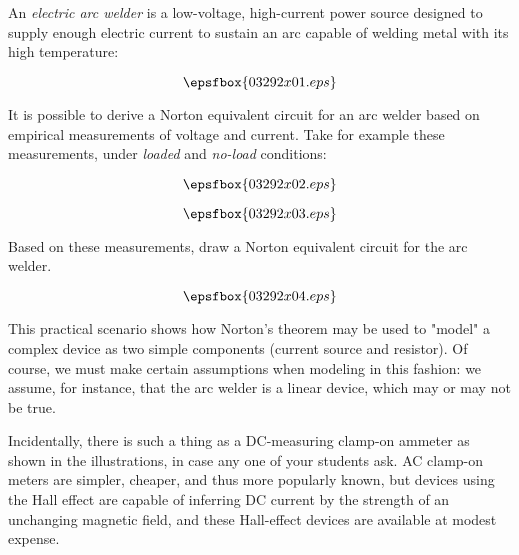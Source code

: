 

An {\it electric arc welder} is a low-voltage, high-current power source designed to supply enough electric current to sustain an arc capable of welding metal with its high temperature:

$$\epsfbox{03292x01.eps}$$

It is possible to derive a Norton equivalent circuit for an arc welder based on empirical measurements of voltage and current.  Take for example these measurements, under {\it loaded} and {\it no-load} conditions:

$$\epsfbox{03292x02.eps}$$

$$\epsfbox{03292x03.eps}$$

Based on these measurements, draw a Norton equivalent circuit for the arc welder.







$$\epsfbox{03292x04.eps}$$







This practical scenario shows how Norton's theorem may be used to "model" a complex device as two simple components (current source and resistor).  Of course, we must make certain assumptions when modeling in this fashion: we assume, for instance, that the arc welder is a linear device, which may or may not be true.

Incidentally, there is such a thing as a DC-measuring clamp-on ammeter as shown in the illustrations, in case any one of your students ask.  AC clamp-on meters are simpler, cheaper, and thus more popularly known, but devices using the Hall effect are capable of inferring DC current by the strength of an unchanging magnetic field, and these Hall-effect devices are available at modest expense.





